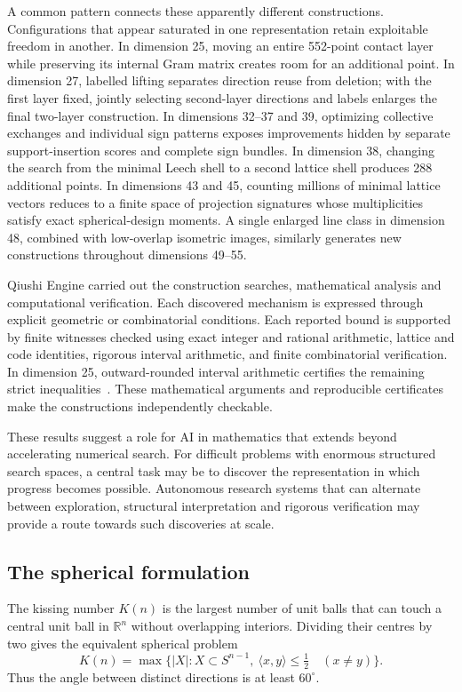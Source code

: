 A common pattern connects these apparently different constructions.
Configurations that appear saturated in one representation retain
exploitable freedom in another. In dimension 25, moving an entire
552-point contact layer while preserving its internal Gram matrix
creates room for an additional point. In dimension 27, labelled lifting
separates direction reuse from deletion; with the first layer fixed,
jointly selecting second-layer directions and labels enlarges the final
two-layer construction. In dimensions 32--37 and 39, optimizing
collective exchanges and individual sign patterns exposes improvements
hidden by separate support-insertion scores and complete sign bundles.
In dimension 38, changing the search from the minimal Leech shell to a
second lattice shell produces 288 additional points. In dimensions 43
and 45, counting millions of minimal lattice vectors reduces to a finite
space of projection signatures whose multiplicities satisfy exact
spherical-design moments. A single enlarged line class in dimension 48,
combined with low-overlap isometric images, similarly generates new
constructions throughout dimensions 49--55.

Qiushi Engine carried out the construction searches, mathematical analysis
and computational verification. Each discovered mechanism is expressed
through explicit geometric or combinatorial conditions. Each reported
bound is supported by finite witnesses checked using exact integer and
rational arithmetic, lattice and code identities, rigorous interval
arithmetic, and finite combinatorial verification. In dimension 25,
outward-rounded interval arithmetic certifies the remaining strict
inequalities~\cite{johansson-arb}. These mathematical arguments and
reproducible certificates make the constructions independently
checkable.

These results suggest a role for AI in mathematics that extends beyond
accelerating numerical search. For difficult problems with enormous
structured search spaces, a central task may be to discover the
representation in which progress becomes possible. Autonomous research
systems that can alternate between exploration, structural interpretation
and rigorous verification may provide a route towards such discoveries
at scale.

\subsection{The spherical formulation}

The kissing number $K(n)$ is the largest number of unit balls that can
touch a central unit ball in $\mathbb R^n$ without overlapping interiors.
Dividing their centres by two gives the equivalent spherical problem
\[
K(n)=\max\{|X|:X\subset S^{n-1},\
\langle x,y\rangle\le\tfrac12\quad(x\ne y)\}.
\]
Thus the angle between distinct directions is at least $60^\circ$.

